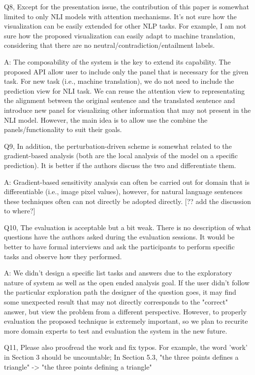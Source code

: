 Q8, Except for the presentation issue, the contribution of this paper is somewhat limited to only NLI models with attention mechanisms. It's not sure how the visualization can be easily extended for other NLP tasks. For example, I am not sure how the proposed visualization can easily adapt to machine translation, considering that there are no neutral/contradiction/entailment labels.

A: The composability of the system is the key to extend its capability. The proposed API allow user to include only the panel that is necessary for the given task. For new task (i.e., machine translation), we do not need to include the prediction view for NLI task. We can reuse the attention view to representating the alignment between the original sentence and the translated sentence and introduce new panel for visualizing other information that may not present in the NLI model. However, the main idea is to allow use the combine the panels/functionality to suit their goals.

Q9, In addition, the perturbation-driven scheme is somewhat related to the gradient-based analysis (both are the local analysis of the model on a specific prediction). It is better if the authors discuss the two and differentiate them.

A: Gradient-based sensitivity analysis can often be carried out for domain that is differentiable (i.e., image pixel values), however, for natural language sentences these techniques often can not directly be adopted directly. [?? add the discussion to where?]

Q10, The evaluation is acceptable but a bit weak. There is no description of what questions have the authors asked during the evaluation sessions. It would be better to have formal interviews and ask the participants to perform specific tasks and observe how they performed.

A: We didn't design a specific list tasks and answers due to the exploratory nature of system as well as the open ended analysis goal. If the user didn't follow the particular exploration path the designer of the question goes, it may find some unexpected result that may not directly corresponds to the "correct" answer, but view the problem from a different perspective. However, to properly evaluation the proposed technique is extremely important, so we plan to recurite more domain experts to test and evaluation the system in the new future. 

Q11, Please also proofread the work and fix typos. For example, the word 'work' in Section 3 should be uncountable; In Section 5.3, "the three points defines a triangle" -> "the three points defining a triangle"

